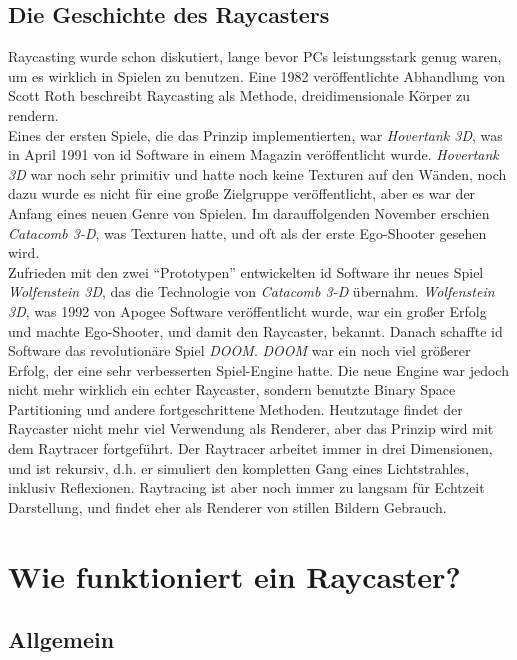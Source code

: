 \documentclass[a4paper,12pt]{report}
\begin{document}
\subsection{Die Geschichte des Raycasters}
Raycasting wurde schon diskutiert, lange bevor PCs leistungsstark genug waren, um es wirklich in Spielen zu benutzen. Eine 1982 veröffentlichte Abhandlung von Scott Roth beschreibt Raycasting als Methode, dreidimensionale Körper zu rendern. \\
Eines der ersten Spiele, die das Prinzip implementierten, war \textit{Hovertank 3D}, was in April 1991 von id Software in einem Magazin veröffentlicht wurde. \textit{Hovertank 3D} war noch sehr primitiv und hatte noch keine Texturen auf den Wänden, noch dazu wurde es nicht für eine große Zielgruppe veröffentlicht, aber es war der Anfang eines neuen Genre von Spielen. Im darauffolgenden November erschien \textit{Catacomb 3-D}, was Texturen hatte, und oft als der erste Ego-Shooter gesehen wird. \\
Zufrieden mit den zwei ``Prototypen'' entwickelten id Software ihr neues Spiel \textit{Wolfenstein 3D}, das die Technologie von \textit{Catacomb 3-D} übernahm. \textit{Wolfenstein 3D}, was 1992 von Apogee Software veröffentlicht wurde, war ein großer Erfolg und machte Ego-Shooter, und damit den Raycaster, bekannt. Danach schaffte id Software das revolutionäre Spiel \textit{DOOM}. \textit{DOOM} war ein noch viel größerer Erfolg, der eine sehr verbesserten Spiel-Engine hatte. Die neue Engine war jedoch nicht mehr wirklich ein echter Raycaster, sondern benutzte Binary Space Partitioning und andere fortgeschrittene Methoden. Heutzutage findet der Raycaster nicht mehr viel Verwendung als Renderer, aber das Prinzip wird mit dem Raytracer fortgeführt. Der Raytracer arbeitet immer in drei Dimensionen, und ist rekursiv, d.h. er simuliert den kompletten Gang eines Lichtstrahles, inklusiv Reflexionen. Raytracing ist aber noch immer zu langsam für Echtzeit Darstellung, und findet eher als Renderer von stillen Bildern Gebrauch.

\section{Wie funktioniert ein Raycaster?}
\subsection{Allgemein}
\end{document}
